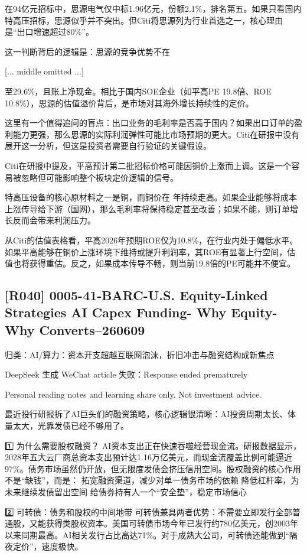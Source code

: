 \documentclass[11pt]{ctexart}
\begin{document}
在94亿元招标中，思源电气仅中标1.96亿元，份额2.1\%，排名第五。如果只看国内特高压招标，思源似乎并不突出。但Citi将思源列为行业首选之一，核心理由是“出口增速超过80\%”。

这一判断背后的逻辑是：思源的竞争优势不在

[... middle omitted ...]

至29.6\%，且账上净现金。相比于国内SOE企业（如平高PE 19.8倍、ROE 10.8\%），思源的估值溢价背后，是市场对其海外增长持续性的定价。

这里有一个值得追问的盲点：出口业务的毛利率是否高于国内？如果出口订单的盈利能力更强，那么思源的实际利润弹性可能比市场预期的更大。Citi在研报中没有展开这一分析，但这是投资者需要自行验证的关键假设。

Citi在研报中提及，平高预计第二批招标价格可能因铜价上涨而上调。这是一个容易被忽略但可能影响整个板块定价逻辑的信号。

特高压设备的核心原材料之一是铜，而铜价在 年持续走高。如果企业能够将成本上涨传导给下游（国网），那么毛利率将保持稳定甚至改善；如果不能，则订单增长反而会带来利润压力。

从Citi的估值表格看，平高2026年预期ROE仅为10.8\%，在行业内处于偏低水平。如果平高能够在铜价上涨环境下维持或提升利润率，其ROE有显著上行空间，估值也将获得重估。反之，如果成本传导不畅，则当前19.8倍的PE可能并不便宜。

\subsection{[R040] 0005-41-BARC-U.S. Equity-Linked Strategies AI Capex Funding- Why Equity- Why Converts--260609}
{\small\color{refgray}归类：AI/算力：资本开支超越互联网泡沫，折旧冲击与融资结构成新焦点}

DeepSeek 生成 WeChat article 失败：Response ended prematurely

Personal reading notes and learning share only. Not investment advice.

最近投行研报拆了AI巨头们的融资策略，核心逻辑很清晰：AI投资周期太长、体量太大，光靠发债已经不够用了。

1️⃣ 为什么需要股权融资？ AI资本支出正在快速吞噬经营现金流。研报数据显示，2028年五大云厂商总资本支出预计达1.16万亿美元，而现金流覆盖比例可能逼近97\%。债务市场虽然仍开放，但无限度发债会挤压信用空间。股权融资的核心作用不是“缺钱”，而是： 拓宽融资渠道，减少对单一债务市场的依赖 降低杠杆率，为未来继续发债留出空间 给债券持有人一个“安全垫”，稳定市场信心

2️⃣ 可转债：债务和股权的中间地带 可转债兼具两者优势：不需要立即发行全部普通股，又能获得类股权资本。美国可转债市场今年已发行约780亿美元，创2003年以来同期最高。AI相关发行占比高达71\%。对于成熟大公司，可转债还能做到“隔夜定价”，速度极快。
\end{document}
